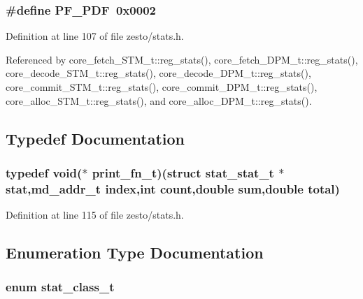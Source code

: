 \subsubsection[{PF\_\-PDF}]{\setlength{\rightskip}{0pt plus 5cm}\#define PF\_\-PDF~0x0002}\label{zesto_2stats_8h_7e857abbfb7e3dc6d4446052a96653a3}




Definition at line 107 of file zesto/stats.h.

Referenced by core\_\-fetch\_\-STM\_\-t::reg\_\-stats(), core\_\-fetch\_\-DPM\_\-t::reg\_\-stats(), core\_\-decode\_\-STM\_\-t::reg\_\-stats(), core\_\-decode\_\-DPM\_\-t::reg\_\-stats(), core\_\-commit\_\-STM\_\-t::reg\_\-stats(), core\_\-commit\_\-DPM\_\-t::reg\_\-stats(), core\_\-alloc\_\-STM\_\-t::reg\_\-stats(), and core\_\-alloc\_\-DPM\_\-t::reg\_\-stats().

\subsection{Typedef Documentation}
\subsubsection[{print\_\-fn\_\-t}]{\setlength{\rightskip}{0pt plus 5cm}typedef void($\ast$ {\bf print\_\-fn\_\-t})(struct {\bf stat\_\-stat\_\-t} $\ast$stat,{\bf md\_\-addr\_\-t} index,int count,double sum,double total)}\label{zesto_2stats_8h_e4b17f8ba8e81941519f3e55dd08a4ff}




Definition at line 115 of file zesto/stats.h.

\subsection{Enumeration Type Documentation}
\subsubsection[{stat\_\-class\_\-t}]{\setlength{\rightskip}{0pt plus 5cm}enum {\bf stat\_\-class\_\-t}}\label{zesto_2stats_8h_7caa50c971612efca8f45cbf1106e596}


